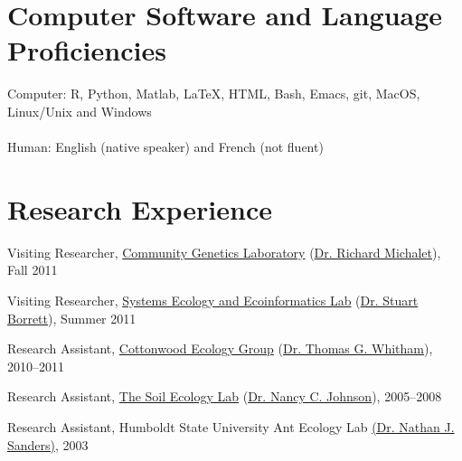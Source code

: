 \documentclass[letterpaper]{article}
\renewenvironment{itemize}{
  \begin{list}{}{
    \setlength{\leftmargin}{1em}
  }
}{
  \end{list}
}
\begin{document}
\section*{Computer Software and Language Proficiencies}
Computer: R, Python, Matlab, \LaTeX, HTML, Bash, Emacs, git, MacOS,
Linux/Unix and Windows \\

\\
Human: English (native speaker) and French (not fluent)

\section*{Research Experience}

\begin{itemize}
\item Visiting Researcher,
\href{https://www4.bordeaux-aquitaine.inra.fr/biogeco/}{Community Genetics Laboratory}
(\href{http://www4.bordeaux-aquitaine.inra.fr/biogeco_eng/People/Former-members/Michalet-Richard}{Dr. Richard
Michalet}), Fall 2011
\end{itemize}

\begin{itemize}
\item Visiting Researcher,
\href{http://people.uncw.edu/borretts/}{Systems Ecology and
  Ecoinformatics Lab}
(\href{http://people.uncw.edu/borretts/people.html}{Dr. Stuart Borrett}), Summer 2011
\end{itemize}

\begin{itemize}
\item Research Assistant,
\href{http://www.poplar.nau.edu/}{Cottonwood Ecology Group} (\href{http://www.poplar.nau.edu/people.php?mode=showus&user=tgw}{Dr. Thomas G. Whitham}), 2010--2011
\end{itemize}

\begin{itemize}
\item Research Assistant,
\href{http://www.nau.edu/~envsci/johnsonlab/index.htm}{The Soil Ecology Lab} (\href{http://www.nau.edu/~envsci/johnsonlab/NCJ.htm}{Dr. Nancy C. Johnson}), 2005--2008
\end{itemize}

\begin{itemize}
\item Research Assistant, Humboldt State University Ant Ecology Lab \href{http://web.utk.edu/~nsanders/nate.html}{(Dr. Nathan J. Sanders)},  2003
\end{itemize}
\end{document}

